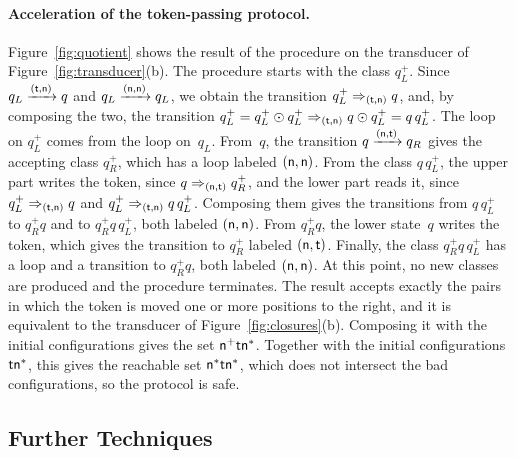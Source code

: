 \paragraph{Acceleration of the token-passing protocol.}
Figure~\ref{fig:quotient} shows the result of the procedure on the transducer
of Figure~\ref{fig:transducer}(b). The procedure starts with the class
$q_L^+$. Since $q_L \xrightarrow{(\mathsf{t},\mathsf{n})} q$ and $q_L
\xrightarrow{(\mathsf{n},\mathsf{n})} q_L$, we obtain the transition $q_L^+
\Rightarrow_{(\mathsf{t},\mathsf{n})} q$, and, by composing the two, the transition
$q_L^+ = q_L^+ \odot q_L^+ \Rightarrow_{(\mathsf{t},\mathsf{n})} q \odot q_L^+ =
q\,q_L^+$. The loop on $q_L^+$ comes from the loop on~$q_L$. From~$q$, the
transition $q \xrightarrow{(\mathsf{n},\mathsf{t})} q_R$ gives the accepting class
$q_R^+$, which has a loop labeled $(\mathsf{n},\mathsf{n})$. From the class
$q\,q_L^+$, the upper part writes the token, since $q \Rightarrow_{(\mathsf{n},\mathsf{t})}
q_R^+$, and the lower part reads it, since $q_L^+ \Rightarrow_{(\mathsf{t},\mathsf{n})}
q$ and $q_L^+ \Rightarrow_{(\mathsf{t},\mathsf{n})} q\,q_L^+$. Composing them gives the
transitions from $q\,q_L^+$ to $q_R^+ q$ and to $q_R^+ q\,q_L^+$, both labeled
$(\mathsf{n},\mathsf{n})$. From $q_R^+ q$, the lower state~$q$ writes the token, which
gives the transition to $q_R^+$ labeled $(\mathsf{n},\mathsf{t})$. Finally, the class
$q_R^+ q\, q_L^+$ has a loop and a transition to $q_R^+ q$, both labeled
$(\mathsf{n},\mathsf{n})$. At this point, no new classes are produced and the
procedure terminates. The result accepts exactly the pairs in which the token
is moved one or more positions to the right, and it is equivalent to the
transducer of Figure~\ref{fig:closures}(b). Composing it with the initial
configurations gives the set $\mathsf{n}^+\mathsf{t}\mathsf{n}^*$. Together with the initial
configurations $\mathsf{t}\mathsf{n}^*$, this gives the reachable set
$\mathsf{n}^*\mathsf{t}\mathsf{n}^*$, which does not intersect the bad configurations, so the
protocol is safe.

\subsection{Further Techniques}

